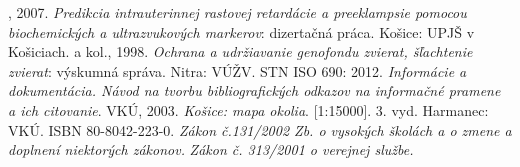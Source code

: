 \documentclass[thesismargins, english, thesislinespacing, twoside, openright, upjsfrontpage]{rnthesis}
\begin{document}
\begin{thebibliography}{9}
  , 2007. \emph{Predikcia intrauterinnej rastovej retardácie a preeklampsie pomocou biochemických a ultrazvukových markerov}: dizertačná práca. Košice: UPJŠ v Košiciach.
   a kol., 1998. \emph{Ochrana a udržiavanie genofondu zvierat, šľachtenie zvierat}: výskumná správa. Nitra: VÚŽV.
  STN ISO 690: 2012. \emph{Informácie a dokumentácia. Návod na tvorbu bibliografických odkazov na informačné pramene a ich citovanie}.
  VKÚ, 2003. \emph{Košice: mapa okolia}. [1:15000]. 3. vyd. Harmanec: VKÚ. ISBN 80-8042-223-0.
  \emph{Zákon č.131/2002 Zb. o vysokých školách a o zmene a doplnení niektorých zákonov.}
  \emph{Zákon č. 313/2001 o verejnej službe.}

\end{thebibliography}
\end{document}
